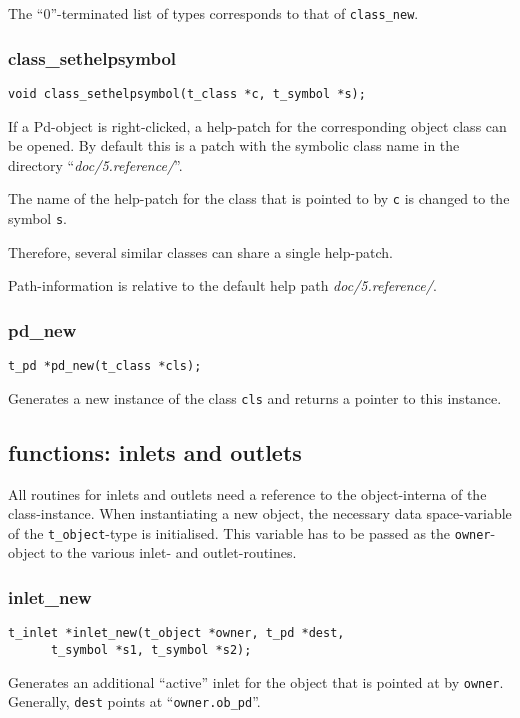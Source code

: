\documentclass[12pt, a4paper,english,titlepage]{article}
\begin{document}
\begin{appendix}
The ``0''-terminated list of types corresponds to that of \verb+class_new+.

\subsubsection{class\_sethelpsymbol}
\begin{verbatim}
void class_sethelpsymbol(t_class *c, t_symbol *s);
\end{verbatim}

If a Pd-object is right-clicked, a help-patch for the corresponding object class
can be opened.
By default this is a patch with the symbolic class name in the
directory ``{\em doc/5.reference/}''.

The name of the help-patch for the class that is pointed to by \verb+c+
is changed to the symbol \verb+s+.

Therefore, several similar classes can share a single help-patch.

Path-information is relative to the default help path {\em doc/5.reference/}.

\subsubsection{pd\_new}
\begin{verbatim}
t_pd *pd_new(t_class *cls);
\end{verbatim}
Generates a new instance of the class \verb+cls+ and
returns a pointer to this instance.

\subsection{functions: inlets and outlets}
All routines for inlets and outlets need a reference to the object-interna of
the class-instance.
When instantiating a new object,
the necessary data space-variable of the \verb+t_object+-type is initialised.
This variable has to be passed as the \verb+owner+-object to the
various inlet- and outlet-routines.

\subsubsection{inlet\_new}
\begin{verbatim}
t_inlet *inlet_new(t_object *owner, t_pd *dest,
      t_symbol *s1, t_symbol *s2);
\end{verbatim}
Generates an additional ``active'' inlet for the object
that is pointed at by \verb+owner+.
Generally, \verb+dest+ points at ``\verb+owner.ob_pd+''.


\end{appendix}
\end{document}
